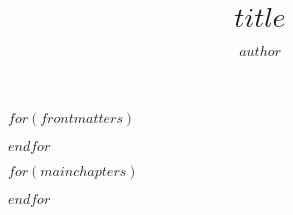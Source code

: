 \documentclass[nemilov1]{Nemilov}
\begin{document}
\frontmatter



\title{$title$}


\author{$author$}

\maketitle

\setcounter{page}{5}


\tableofcontents

$for(frontmatters)$

$endfor$


\mainmatter


$for(mainchapters)$

$endfor$

%
%

\appendix

%

\cleardoublepage




\cleardoublepage
\printindex
\cleardoublepage


\clearpage


\end{document}
